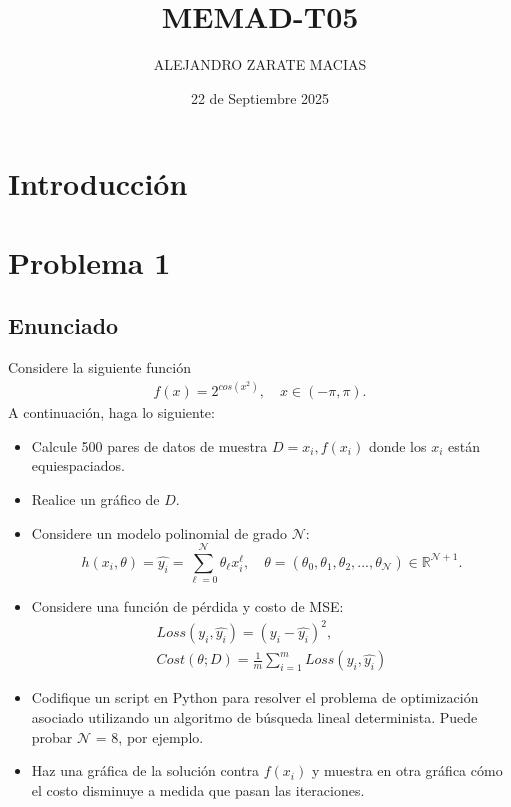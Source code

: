 \documentclass{article}
\title{MEMAD-T05}
\author{ALEJANDRO ZARATE MACIAS}
\date{22 de Septiembre 2025}
\begin{document}
\maketitle

\section*{Introducción}

\section{Problema 1}

\subsection{Enunciado}

Considere la siguiente función
\begin{align*}
    f(x) = 2^{cos(x^2)}, \quad x \in (-\pi,\pi).
\end{align*}
A continuación, haga lo siguiente:

\begin{itemize}
    \item Calcule 500 pares de datos de muestra $D = {x_i,f(x_i)}$ donde los $x_i$ están equiespaciados.
    \item Realice un gráfico de $D$.
    \item Considere un modelo polinomial de grado $\mathcal{N}$:
        \begin{equation*}
            h(x_i, \theta) = \hat{y_i} = \sum^{\mathcal{N}}_{\ell=0}\theta_{\ell}x^{\ell}_{i}, \quad \theta=(\theta_{0}, \theta_{1}, \theta_{2}, ...,\theta_{\mathcal{N}}) \in \mathbb{R}^{\mathcal{N}+1}.
        \end{equation*}
    \item Considere una función de pérdida y costo de MSE:
        \begin{align*}
            Loss(y_i, \hat{y_i}) = (y_i - \hat{y_i})^2, \\
            Cost(\theta;D) = \frac{1}{m}\sum^{m}_{i=1}Loss(y_i, \hat{y_i})
        \end{align*}
    \item Codifique un script en Python para resolver el problema de optimización asociado utilizando un algoritmo de búsqueda lineal determinista. Puede probar $\mathcal{N}$ = 8, por ejemplo.
    \item Haz una gráfica de la solución contra $f(x_i)$ y muestra en otra gráfica cómo el costo disminuye a medida que pasan las iteraciones.
\end{itemize}
\end{document}
